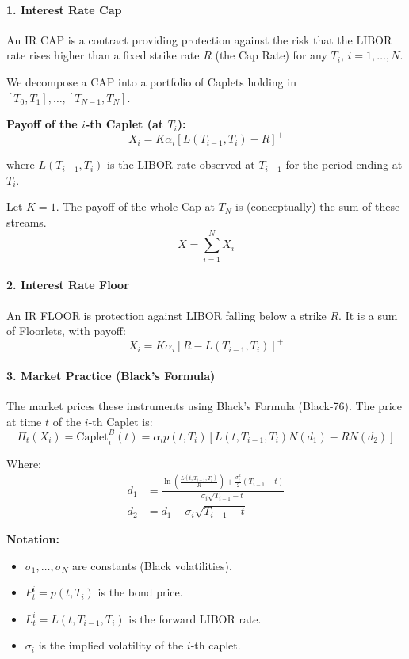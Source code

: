 \documentclass[12pt,a4paper]{article}
\theoremstyle{definition}
\begin{document}
\paragraph{1. Interest Rate Cap}

An IR CAP is a contract providing protection against the risk that the LIBOR rate rises higher than a fixed strike rate $R$ (the Cap Rate) for any $T_i$, $i = 1, \ldots, N$.

We decompose a CAP into a portfolio of Caplets holding in $[T_0, T_1], \ldots, [T_{N-1}, T_N]$.

\textbf{Payoff of the $i$-th Caplet (at $T_i$):}
\[
X_i = K\alpha_i[L(T_{i-1}, T_i) - R]^+
\]

where $L(T_{i-1}, T_i)$ is the LIBOR rate observed at $T_{i-1}$ for the period ending at $T_i$.

Let $K = 1$. The payoff of the whole Cap at $T_N$ is (conceptually) the sum of these streams.
\[
X = \sum_{i=1}^N X_i
\]

\paragraph{2. Interest Rate Floor}

An IR FLOOR is protection against LIBOR falling below a strike $R$. It is a sum of Floorlets, with payoff:
\[
X_i = K\alpha_i[R - L(T_{i-1}, T_i)]^+
\]

\paragraph{3. Market Practice (Black's Formula)}

The market prices these instruments using Black's Formula (Black-76). The price at time $t$ of the $i$-th Caplet is:
\[
\Pi_t(X_i) = \text{Caplet}_i^B(t) = \alpha_i p(t, T_i)[L(t, T_{i-1}, T_i)N(d_1) - RN(d_2)]
\]

Where:
\[
\begin{aligned}
d_1 &= \frac{\ln\left(\frac{L(t, T_{i-1}, T_i)}{R}\right) + \frac{\sigma_i^2}{2}(T_{i-1} - t)}{\sigma_i\sqrt{T_{i-1} - t}} \\
d_2 &= d_1 - \sigma_i\sqrt{T_{i-1} - t}
\end{aligned}
\]

\textbf{Notation:}
\begin{itemize}
\item $\sigma_1, \ldots, \sigma_N$ are constants (Black volatilities).
\item $P_t^i = p(t, T_i)$ is the bond price.
\item $L_t^i = L(t, T_{i-1}, T_i)$ is the forward LIBOR rate.
\item $\sigma_i$ is the implied volatility of the $i$-th caplet.
\end{itemize}
\end{document}
